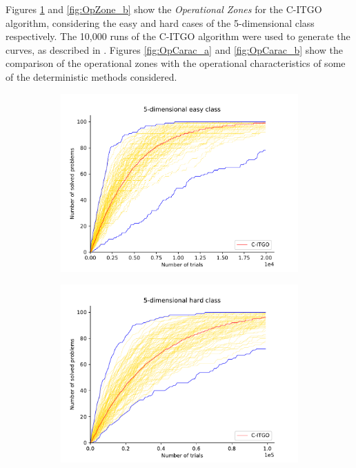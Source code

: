 

Figures \ref{fig:OpZone_a} and \ref{fig:OpZone_b} show the \textit{Operational Zones} for the C-ITGO algorithm, considering the easy and hard cases of the 5-dimensional class respectively. The 10,000 runs of the C-ITGO algorithm were used to generate the curves, as described in \cite{NAT}. Figures \ref{fig:OpCarac_a} and \ref{fig:OpCarac_b} show the comparison of the operational zones with the operational characteristics of some of the deterministic methods considered.



\begin{figure}[h]
    \centering
    \begin{subfigure}{.5\textwidth}
      \centering
      \includegraphics[width=1.1\linewidth]{img/GKLS/mult_5E}
      \caption{}
      \label{fig:OpZone_a}
    \end{subfigure}%
    \begin{subfigure}{.5\textwidth}
      \centering
      \includegraphics[width=1.1\linewidth]{img/GKLS/mult_5H}

\end{subfigure}
\end{figure}

